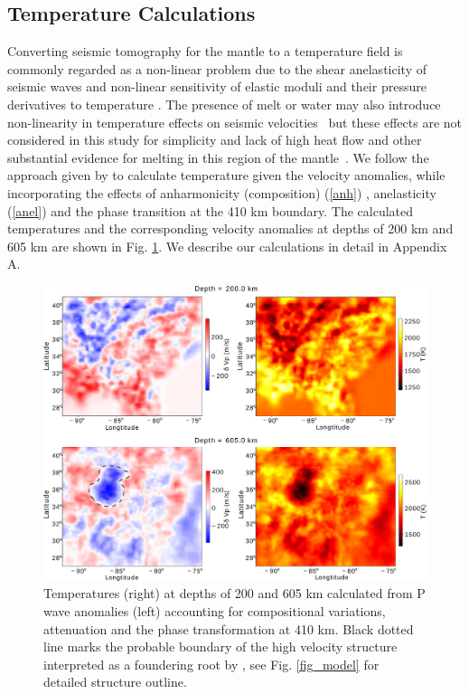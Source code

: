 \documentclass[draft,linenumbers]{agujournal2018}
\begin{document}
\subsection{Temperature Calculations} \label{temp_var}
    Converting seismic tomography for the mantle to a temperature field is commonly regarded as a non-linear problem due to the shear anelasticity of seismic waves \citep{minster1981model, karato1993importance, sobolev1996upper, Goes_2000, artemieva2004shear} and non-linear sensitivity of elastic moduli and their pressure derivatives to temperature \citep{duffy1989seismic, anderson1992high, Cammarano2003, stixrude2005thermodynamics}. The presence of melt or water may also introduce non-linearity in temperature effects on seismic velocities~\citep{Karato_1998} but these effects are not considered in this study for simplicity and lack of high heat flow and other substantial evidence for melting in this region of the  mantle~\citep{blackwell2006assessment}. We follow the approach given by \citet{Cammarano2003} to calculate temperature given the velocity anomalies, while incorporating the effects of anharmonicity (composition) (\ref{anh}) , anelasticity (\ref{anel}) and the phase transition at the 410 km boundary. The calculated temperatures and the corresponding velocity anomalies at depths of 200 km and 605 km are shown in Fig. \ref{fig_temp}. We describe our calculations in detail in Appendix A. 
%
\begin{figure}[ht]
    \centering
    \includegraphics[width=0.75\linewidth]{figures/figure_temp.png}
    \caption{Temperatures (right) at depths of 200 and 605 km calculated from P wave anomalies (left) accounting for compositional variations, attenuation and the phase transformation at 410 km. Black dotted line marks the probable boundary of the high velocity structure interpreted as a foundering root by \citet{Biryol_2016}, see Fig. \ref{fig_model} for detailed structure outline.}
    \label{fig_temp}
 \end{figure}
\end{document}
